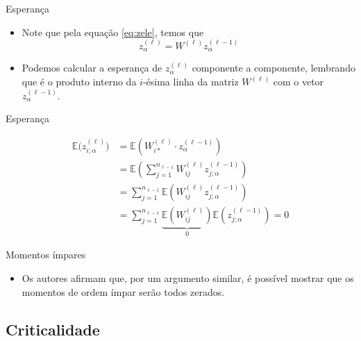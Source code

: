 \documentclass{beamer}
\newcommand{\EE}{\mathbb{E}}
\def\eell{{(\ell)}}
\begin{document}
\begin{frame}{Esperança}
	\begin{itemize}
		\item Note que pela equação \eqref{eq:zele}, temos que 
		\begin{equation*}\tag{3.2'}\label{eq:zele1}
		z^\eell_{\alpha} = W^\eell z^{(\ell -1)}_\alpha
		\end{equation*}
		\item Podemos calcular a esperança de $z^\eell_{\alpha}$ componente a componente, lembrando que é o produto interno da $i$-ésima linha da matriz $W^\eell$ com o vetor $z^{(\ell -1)}_\alpha$.
	\end{itemize}
\end{frame}
\begin{frame}{Esperança}
	
	\begin{align*}
		\EE\big(z^\eell_{i;\alpha}\big) &= \EE\left(W_{i*}^\eell \cdot z^{(\ell -1)}_\alpha\right) \\%
		&= \EE\left(\sum_{j=1}^{n_{\ell-1}} W_{ij}^\eell z^{(\ell -1)}_{j;\alpha}\right) \\%
		&=\sum_{j=1}^{n_{\ell-1}}\EE\left( W_{ij}^\eell z^{(\ell -1)}_{j;\alpha}\right) \\%
		&= \sum_{j=1}^{n_{\ell-1}} \underset{0}{\underbrace{\EE\left(W_{ij}^\eell\right)}} \EE\left(z^{(\ell -1)}_{j;\alpha}\right) = 0 \tag{3.6} \label{eq:media} %
	\end{align*} 
\end{frame}

\begin{frame}{Momentos ímpares}
	\begin{itemize}
		\item Os autores afirmam que, por um argumento similar, é possível mostrar que os momentos de ordem ímpar serão todos zerados. 
	\end{itemize}
\end{frame}

\subsection{Criticalidade}

\begin{frame}
	\tableofcontents[currentsubsection]
\end{frame}
\end{document}
